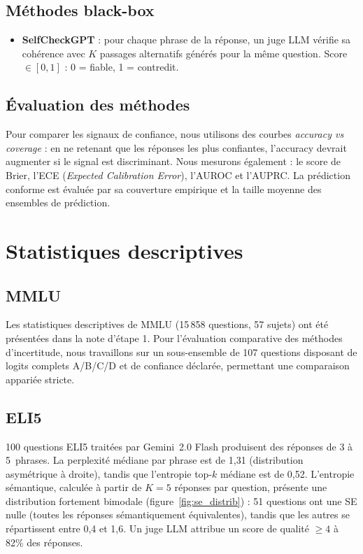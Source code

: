 \documentclass[a4paper, 11pt]{article}
\begin{document}
\subsection{Méthodes black-box}
\begin{itemize}[nosep]
    \item \textbf{SelfCheckGPT} : pour chaque phrase de la réponse, un juge LLM vérifie sa cohérence avec $K$ passages alternatifs générés pour la même question. Score $\in [0,1]$ : 0 = fiable, 1 = contredit.
\end{itemize}
\subsection{Évaluation des méthodes}
Pour comparer les signaux de confiance, nous utilisons des courbes \emph{accuracy vs coverage} : en ne retenant que les réponses les plus confiantes, l'accuracy devrait augmenter si le signal est discriminant. Nous mesurons également : le score de Brier, l'ECE (\emph{Expected Calibration Error}), l'AUROC et l'AUPRC. La prédiction conforme est évaluée par sa couverture empirique et la taille moyenne des ensembles de prédiction.
\section{Statistiques descriptives}
\subsection{MMLU}
Les statistiques descriptives de MMLU (15\,858 questions, 57 sujets) ont été présentées dans la note d'étape 1. Pour l'évaluation comparative des méthodes d'incertitude, nous travaillons sur un sous-ensemble de 107 questions disposant de logits complets A/B/C/D et de confiance déclarée, permettant une comparaison appariée stricte.
\subsection{ELI5}
100 questions ELI5 traitées par Gemini~2.0 Flash produisent des réponses de 3 à 5~phrases. La perplexité médiane par phrase est de 1,31 (distribution asymétrique à droite), tandis que l'entropie top-$k$ médiane est de 0,52. L'entropie sémantique, calculée à partir de $K=5$ réponses par question, présente une distribution fortement bimodale (figure~\ref{fig:se_distrib}) : 51 questions ont une SE nulle (toutes les réponses sémantiquement équivalentes), tandis que les autres se répartissent entre 0,4 et 1,6. Un juge LLM attribue un score de qualité $\geq 4$ à 82\% des réponses.
\end{document}

